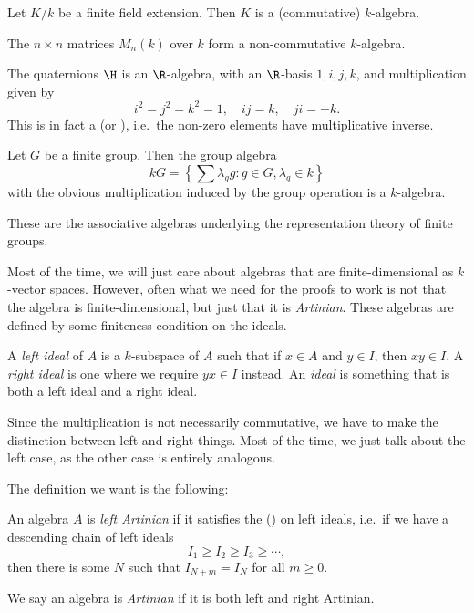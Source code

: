 \documentclass[a4paper]{article}
\begin{document}
\begin{eg}
  Let $K/k$ be a finite field extension. Then $K$ is a (commutative) $k$-algebra.
\end{eg}

\begin{eg}
  The $n\times n$ matrices $M_n(k)$ over $k$ form a non-commutative $k$-algebra.
\end{eg}

\begin{eg}
  The quaternions $\H$ is an $\R$-algebra, with an $\R$-basis $1, i, j, k$, and multiplication given by
  \[
    i^2 = j^2 = k^2 = 1,\quad ij = k,\quad ji = -k.
  \]
  This is in fact a  (or ), i.e.\ the non-zero elements have multiplicative inverse.
\end{eg}

\begin{eg}
  Let $G$ be a finite group. Then the group algebra
  \[
    kG = \left\{\sum \lambda_g g: g \in G, \lambda_g \in k\right\}
  \]
  with the obvious multiplication induced by the group operation is a $k$-algebra.

  These are the associative algebras underlying the representation theory of finite groups.
\end{eg}

Most of the time, we will just care about algebras that are finite-dimensional as $k$-vector spaces. However, often what we need for the proofs to work is not that the algebra is finite-dimensional, but just that it is \emph{Artinian}. These algebras are defined by some finiteness condition on the ideals.

\begin{defi}[Ideal]
  A \emph{left ideal} of $A$ is a $k$-subspace of $A$ such that if $x \in A$ and $y \in I$, then $xy \in I$. A \emph{right ideal} is one where we require $yx \in I$ instead. An \emph{ideal} is something that is both a left ideal and a right ideal.
\end{defi}
Since the multiplication is not necessarily commutative, we have to make the distinction between left and right things. Most of the time, we just talk about the left case, as the other case is entirely analogous.

The definition we want is the following:
\begin{defi}
  An algebra $A$ is \emph{left Artinian} if it satisfies the  () on left ideals, i.e.\ if we have a descending chain of left ideals
  \[
    I_1 \geq I_2 \geq I_3 \geq \cdots,
  \]
  then there is some $N$ such that $I_{N + m} = I_{N}$ for all $m \geq 0$.

  We say an algebra is \emph{Artinian} if it is both left and right Artinian.
\end{defi}
\end{document}
